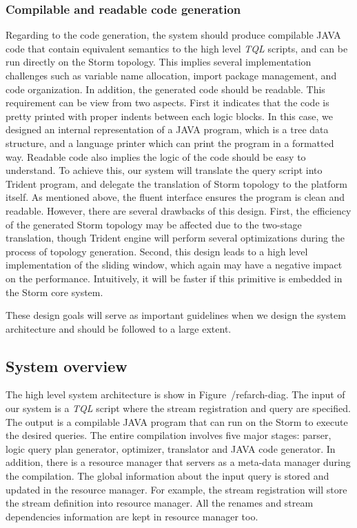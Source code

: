 \documentclass[conference, twocolumn, 11pt]{IEEEtran}
\theoremstyle{definition}
\begin{document}
\subsubsection{Compilable and readable code generation}
Regarding to the code generation, the system should produce compilable JAVA code that contain equivalent semantics to the high level \emph{TQL} scripts, and can be run directly on the Storm topology. This implies several implementation challenges such as variable name allocation, import package management, and code organization. In addition, the generated code should be readable. This requirement can be view from two aspects. First it indicates that the code is pretty printed with proper indents between each logic blocks. In this case, we designed an internal representation of a JAVA program, which is a tree data structure, and a language printer which can print the program in a formatted way. Readable code also implies the logic of the code should be easy to understand. To achieve this, our system will translate the query script into Trident program, and delegate the translation of Storm topology to the platform itself. As mentioned above, the fluent interface ensures the program is clean and readable. However, there are several drawbacks of this design. First, the efficiency of the generated Storm topology may be affected due to the two-stage translation, though Trident engine will perform several optimizations during the process of topology generation. Second, this design leads to a high level implementation of the sliding window, which again may have a negative impact on the performance. Intuitively, it will be faster if this primitive is embedded in the Storm core system.

These design goals will serve as important guidelines when we design the system architecture and should be followed to a large extent. 
\subsection{System overview}
The high level system architecture is show in Figure~/ref{arch-diag}. The input of our system is a \emph{TQL} script where the stream registration and query are specified. The output is a compilable JAVA program that can run on the Storm to execute the desired queries. The entire compilation involves five major stages: parser, logic query plan generator, optimizer, translator and JAVA code generator. In addition, there is a resource manager that servers as a meta-data manager during the compilation. The global information about the input query is stored and updated in the resource manager. For example, the stream registration will store the stream definition into resource manager. All the renames and stream dependencies information are kept in resource manager too.
\end{document}
